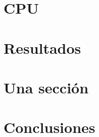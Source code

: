 \documentclass[11pt,a4paper,twoside,pdf]{article}
\numberwithin{equation}{section}
\begin{document}
\newpage

\section{CPU}

\newpage

\section{Resultados}

\newpage






\section{Una sección}






\section{Conclusiones}



\newpage


\begin{thebibliography}{100}


 
\end{thebibliography}
\end{document}

